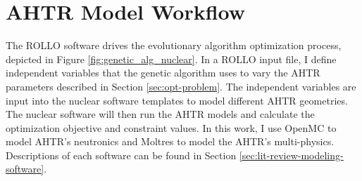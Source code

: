 \section{AHTR Model Workflow}
\label{sec:ahtr-model-workflow}
The \gls{ROLLO} software drives the evolutionary algorithm optimization process, 
depicted in Figure \ref{fig:genetic_alg_nuclear}.
In a \gls{ROLLO} input file, I define independent variables that the genetic algorithm 
uses to vary the \gls{AHTR} parameters described in Section \ref{sec:opt-problem}.
The independent variables are input into the nuclear software templates to model different 
\gls{AHTR} geometries.
The nuclear software will then run the \gls{AHTR} models and calculate the optimization 
objective and constraint values. 
In this work, I use OpenMC \cite{romano_openmc:_2015} to model \gls{AHTR}'s neutronics 
and Moltres \cite{lindsay_introduction_2018} to model the \gls{AHTR}'s multi-physics. 
Descriptions of each software can be found in Section 
\ref{sec:lit-review-modeling-software}.

